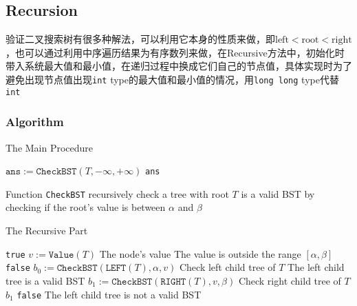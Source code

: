 \subsection{Recursion}
\begin{CJK*}{UTF8}{gbsn}
验证二叉搜索树有很多种解法，可以利用它本身的性质来做，即$\text{left} < \text{root} < \text{right}$，也可以通过利用中序遍历结果为有序数列来做，在Recursive方法中，初始化时带入系统最大值和最小值，在递归过程中换成它们自己的节点值，具体实现时为了避免出现节点值出现\texttt{int} type的最大值和最小值的情况，用\texttt{long long} type代替\texttt{int}
\end{CJK*}
\subsubsection{Algorithm}
\setcounter{algorithm}{0}
\begin{algorithm}[H]
\caption{The Main Procedure}
\begin{algorithmic}[1]
\State $\texttt{ans}:=\texttt{CheckBST}(T, -\infty, +\infty)$
\State \Return \texttt{ans}
\EndProcedure
\end{algorithmic}
\end{algorithm}
Function \texttt{CheckBST} recursively check a tree with root $T$ is a valid BST by checking if the root's value is between $\alpha$ and $\beta$
\begin{algorithm}[H]
\caption{The Recursive Part}
\begin{algorithmic}[1]
\State \Return \texttt{true}
\EndIf
\State $v:=\texttt{Value}(T)$ \Comment The node's value
 \Comment The value is outside the range $[\alpha, \beta]$
\State \Return \texttt{false}
\EndIf
\State $b_0:=\texttt{CheckBST}(\texttt{LEFT}(T), \alpha, v)$ \Comment Check left child tree of $T$
 \Comment The left child tree is a valid BST
\State $b_1:=\texttt{CheckBST}(\texttt{RIGHT}(T), v, \beta)$ \Comment Check right child tree of $T$
\State \Return $b_1$
\Else
\State \Return \texttt{false} \Comment The left child tree is not a valid BST
\EndIf
\EndFunction
\end{algorithmic}
\end{algorithm}
